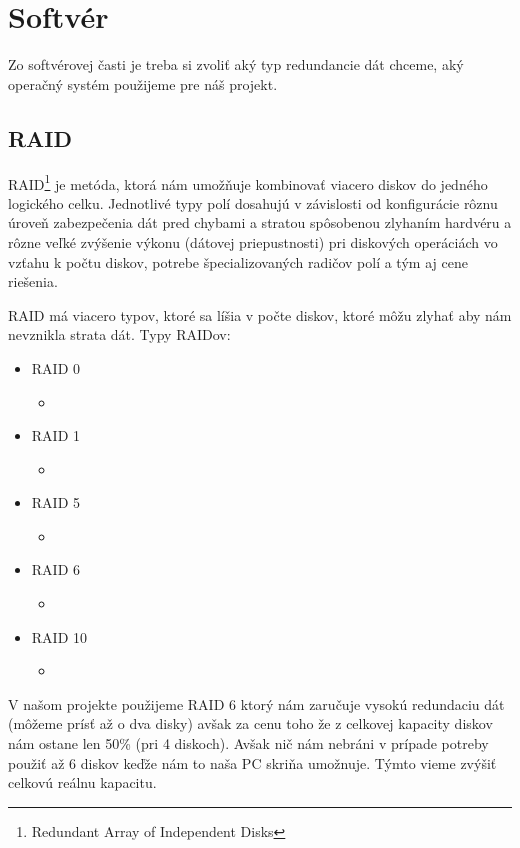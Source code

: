 \documentclass[12pt,oneside,slovak,a4paper]{article}
\begin{document}
\section{Softvér}
Zo softvérovej časti je treba si zvoliť aký typ redundancie dát chceme, aký operačný systém použijeme pre náš projekt.

\subsection{RAID}
RAID\footnote{Redundant Array of Independent Disks} je metóda, ktorá nám umožňuje kombinovať viacero diskov do jedného logického celku. Jednotlivé typy polí dosahujú v závislosti od konfigurácie rôznu úroveň zabezpečenia dát pred chybami a stratou spôsobenou zlyhaním hardvéru a rôzne veľké zvýšenie výkonu (dátovej priepustnosti) pri diskových operáciách vo vzťahu k počtu diskov, potrebe špecializovaných radičov polí a tým aj cene riešenia.

RAID má viacero typov, ktoré sa líšia v počte diskov, ktoré môžu zlyhať aby nám nevznikla strata dát. Typy RAIDov:
\begin{spacing}{1.0}
	\begin{itemize}
		\item RAID 0
			\begin{itemize}
				\item 
			\end{itemize}
		\item RAID 1
			\begin{itemize}
				\item 
			\end{itemize}
		\item RAID 5
			\begin{itemize}
				\item 
			\end{itemize}
		\item RAID 6
			\begin{itemize}
				\item 
			\end{itemize}
		\item RAID 10
			\begin{itemize}
				\item 
			\end{itemize}
	\end{itemize}
\end{spacing}

V našom projekte použijeme RAID 6 ktorý nám zaručuje vysokú redundaciu dát (môžeme prísť až o dva disky) avšak za cenu toho že z celkovej kapacity diskov nám ostane len 50\% (pri 4 diskoch). Avšak nič nám nebráni v prípade potreby použiť až 6 diskov keďže nám to naša PC skriňa umožnuje. Týmto vieme zvýšiť celkovú reálnu kapacitu.
\end{document}

